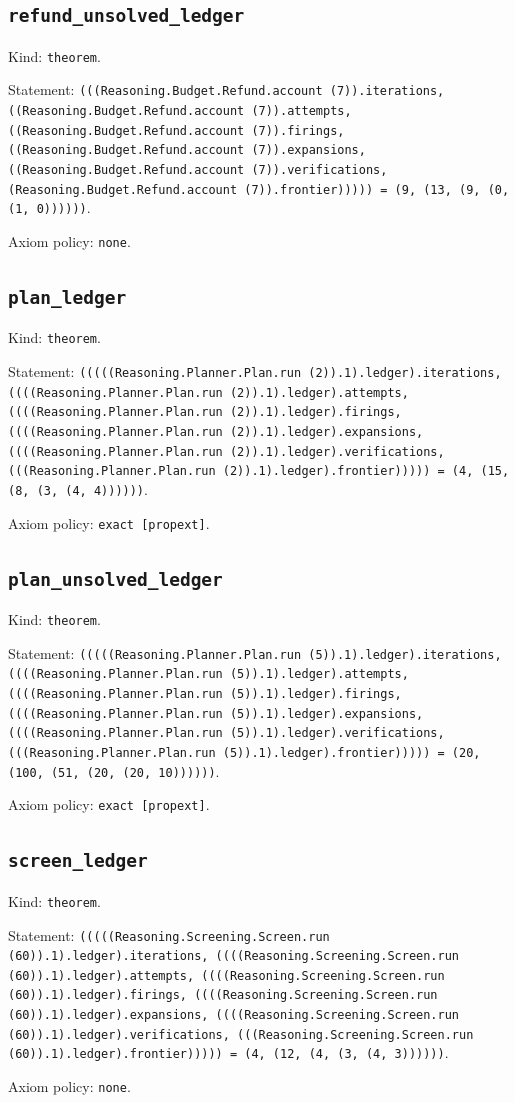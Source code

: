 \documentclass[11pt]{article}
\begin{document}
\subsection*{\texttt{refund\_unsolved\_ledger}}
\noindent Kind: \texttt{theorem}.\par
\noindent Statement: \texttt{(((Reasoning.Budget.Refund.account (7)).iterations, ((Reasoning.Budget.Refund.account (7)).attempts, ((Reasoning.Budget.Refund.account (7)).firings, ((Reasoning.Budget.Refund.account (7)).expansions, ((Reasoning.Budget.Refund.account (7)).verifications, (Reasoning.Budget.Refund.account (7)).frontier))))) = (9, (13, (9, (0, (1, 0))))))}.\par
\noindent Axiom policy: \texttt{none}.\par
\subsection*{\texttt{plan\_ledger}}
\noindent Kind: \texttt{theorem}.\par
\noindent Statement: \texttt{(((((Reasoning.Planner.Plan.run (2)).1).ledger).iterations, ((((Reasoning.Planner.Plan.run (2)).1).ledger).attempts, ((((Reasoning.Planner.Plan.run (2)).1).ledger).firings, ((((Reasoning.Planner.Plan.run (2)).1).ledger).expansions, ((((Reasoning.Planner.Plan.run (2)).1).ledger).verifications, (((Reasoning.Planner.Plan.run (2)).1).ledger).frontier))))) = (4, (15, (8, (3, (4, 4))))))}.\par
\noindent Axiom policy: \texttt{exact [propext]}.\par
\subsection*{\texttt{plan\_unsolved\_ledger}}
\noindent Kind: \texttt{theorem}.\par
\noindent Statement: \texttt{(((((Reasoning.Planner.Plan.run (5)).1).ledger).iterations, ((((Reasoning.Planner.Plan.run (5)).1).ledger).attempts, ((((Reasoning.Planner.Plan.run (5)).1).ledger).firings, ((((Reasoning.Planner.Plan.run (5)).1).ledger).expansions, ((((Reasoning.Planner.Plan.run (5)).1).ledger).verifications, (((Reasoning.Planner.Plan.run (5)).1).ledger).frontier))))) = (20, (100, (51, (20, (20, 10))))))}.\par
\noindent Axiom policy: \texttt{exact [propext]}.\par
\subsection*{\texttt{screen\_ledger}}
\noindent Kind: \texttt{theorem}.\par
\noindent Statement: \texttt{(((((Reasoning.Screening.Screen.run (60)).1).ledger).iterations, ((((Reasoning.Screening.Screen.run (60)).1).ledger).attempts, ((((Reasoning.Screening.Screen.run (60)).1).ledger).firings, ((((Reasoning.Screening.Screen.run (60)).1).ledger).expansions, ((((Reasoning.Screening.Screen.run (60)).1).ledger).verifications, (((Reasoning.Screening.Screen.run (60)).1).ledger).frontier))))) = (4, (12, (4, (3, (4, 3))))))}.\par
\noindent Axiom policy: \texttt{none}.\par
\end{document}
